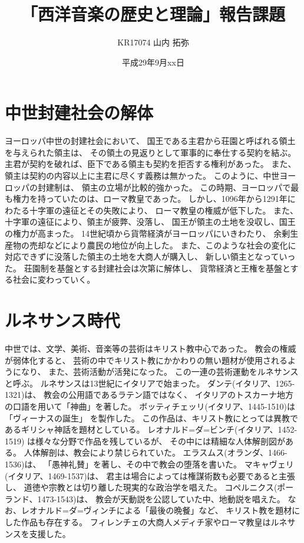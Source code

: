 \documentclass[a4j]{jarticle}
\title{「西洋音楽の歴史と理論」報告課題}
\author{KR17074 山内 拓弥}
\date{平成29年9月xx日}
\begin{document}

\section{中世封建社会の解体}

\large

ヨーロッパ中世の封建社会において、
国王である主君から荘園と呼ばれる領土を与えられた領主は、
その領土の見返りとして軍事的に奉仕する契約を結ぶ。
主君が契約を破れば、臣下である領主も契約を拒否する権利があった。
また、領主は契約の内容以上に主君に尽くす義務は無かった。
このように、中世ヨーロッパの封建制は、
領主の立場が比較的強かった。
この時期、ヨーロッパで最も権力を持っていたのは、ローマ教皇であった。
しかし、1096年から1291年にわたる十字軍の遠征とその失敗により、
ローマ教皇の権威が低下した。
また、十字軍の遠征により、領主が疲弊、没落し、
国王が領主の土地を没収し、国王の権力が高まった。
14世紀頃から貨幣経済がヨーロッパにいきわたり、
余剰生産物の売却などにより農民の地位が向上した。
また、このような社会の変化に対応できずに没落した領主の土地を大商人が購入し、
新しい領主となっていった。
荘園制を基盤とする封建社会は次第に解体し、
貨幣経済と王権を基盤とする社会に変わっていく。

\section{ルネサンス時代}

中世では、文学、美術、音楽等の芸術はキリスト教中心であった。
教会の権威が弱体化すると、
芸術の中でキリスト教にかかわりの無い題材が使用されるようになり、
また、芸術活動が活発になった。
この一連の芸術運動をルネサンスと呼ぶ。
ルネサンスは13世紀にイタリアで始まった。
ダンテ(イタリア、1265-1321)は、
教会の公用語であるラテン語ではなく、
イタリアのトスカーナ地方の口語を用いて「神曲」を著した。
ボッティチェッリ(イタリア、1445-1510)は「ヴィーナスの誕生」
を製作した。
この作品は、キリスト教にとっては異教であるギリシャ神話を題材としている。
レオナルド=ダ=ビンチ(イタリア、1452-1519)
は様々な分野で作品を残しているが、
その中には精細な人体解剖図がある。
人体解剖は、教会により禁じられていた。
エラスムス(オランダ、1466-1536)は、
「愚神礼賛」を著し、その中で教会の堕落を書いた。
マキャヴェリ(イタリア、1469-1537)は、
君主は場合によっては権謀術数も必要であると主張し、
道徳や宗教とは切り離した現実的な政治学を唱えた。
コペルニクス(ポーランド、1473-1543)は、
教会が天動説を公認していた中、地動説を唱えた。
なお、レオナルド=ダ=ヴィンチによる「最後の晩餐」など、
キリスト教を題材にした作品も存在する。
フィレンチェの大商人メディチ家やローマ教皇はルネサンスを支援した。
\end{document}
